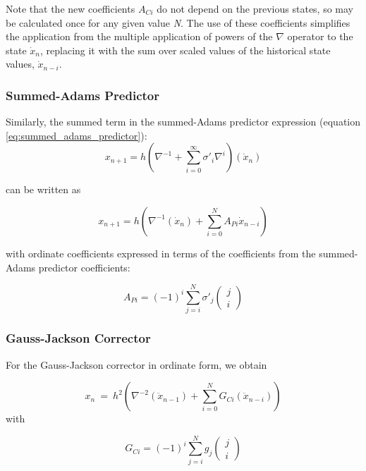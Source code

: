 Note that the new coefficients $A_{Ci}$ do not depend on the previous states, so may be
calculated once for any given value \textit{N}.  The use of these coefficients
simplifies the application from the multiple application of powers of the $\nabla $
operator to the state $\dot{x}_n$, replacing it with the sum over scaled values
of the historical state values, $\dot{x}_{n-i}$. 


\subsubsection{Summed-Adams Predictor}
Similarly, the summed term in the summed-Adams predictor expression
(equation \ref{eq:summed_adams_predictor}):
\begin{equation*}
x_{n+1}=h\left(\nabla ^{-1}+\sum _{i=0}^{\infty }\sigma'_{i}\nabla ^{i}\right)
(\dot{x}_{n})
\end{equation*}

can be written as
 
\begin{equation} \label{eq:sa_pred_form}
x_{n+1}=h\left(\nabla ^{-1}(\dot{x}_{n})+\sum
_{i=0}^{N}A_{Pi}{\dot{x}}_{n-i}\right)
\end{equation}

with ordinate coefficients expressed in terms of the coefficients from the
summed-Adams predictor coefficients:

\begin{equation} \label{eq:A_Pi}
A_{Pi}=(-1)^{i}\sum _{j=i}^{N}\sigma
'_{j}\left(\begin{matrix}j\\i\end{matrix}\right)
\end{equation}

\subsubsection{Gauss-Jackson Corrector}
For the Gauss-Jackson corrector in ordinate form, we obtain


\begin{equation} \label{eq:gj_corr_form}
x_{n}\ =\ h^{2}\left(\nabla ^{-2}({\ddot{x}}_{n-1})+\sum
_{i=0}^{N}G_{Ci}({\ddot{x}}_{n-i})\right)
\end{equation}
with 


\begin{equation} \label{eq:G_Ci}
G_{Ci}=(-1)^{i}\sum
_{j=i}^{N}g_{j}\left(\begin{matrix}j\\i\end{matrix}\right)
\end{equation}

